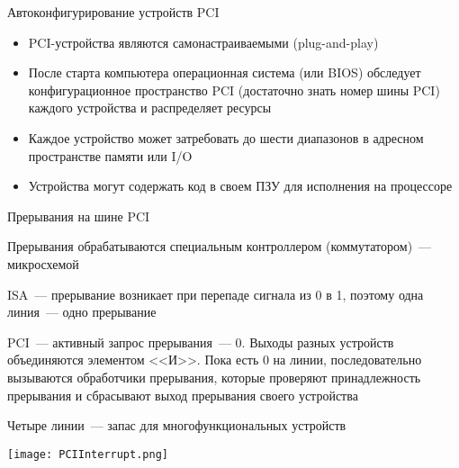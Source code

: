 \documentclass[aspectratio=169,14pt]{beamer}
\begin{document}
\begin{frame}{Автоконфигурирование устройств PCI}
    \begin{itemize}
        \item PCI-устройства являются самонастраиваемыми (plug-and-play)
        \item После старта компьютера операционная система (или BIOS)
        обследует конфигурационное пространство PCI (достаточно знать
        номер шины PCI) каждого устройства и распределяет ресурсы
        \item Каждое устройство может затребовать до шести диапазонов
        в адресном пространстве памяти или I/O
        \item Устройства могут содержать код в своем ПЗУ для исполнения
        на процессоре
    \end{itemize}
\end{frame}

\begin{frame}{Прерывания на шине PCI}
    \begin{itemize}
        \begin{footnotesize}
            \item Прерывания обрабатываются специальным контроллером
            (коммутатором)~--- микросхемой
            \item ISA~--- прерывание возникает при перепаде сигнала из 0 в 1,
            поэтому одна линия~--- одно прерывание
            \item PCI~--- активный запрос прерывания~--- 0. Выходы разных
            устройств объединяются элементом <<И>>. Пока есть 0 на линии,
            последовательно вызываются обработчики прерывания, которые
            проверяют принадлежность прерывания и сбрасывают выход
            прерывания своего устройства
            \item Четыре линии~--- запас для многофункциональных устройств
        \end{footnotesize}
        \texttt{[image: PCIInterrupt.png]}
    \end{itemize}
\end{frame}
\end{document}
